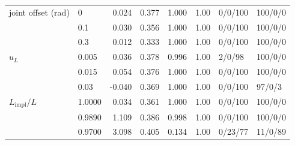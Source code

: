 \begin{tabular}{@{}llrrrrll@{}}
joint offset (rad) & 0 & 0.024 & 0.377 & 1.000 & 1.00 & 0/0/100 & 100/0/0 \\
 & 0.1 & 0.030 & 0.356 & 1.000 & 1.00 & 0/0/100 & 100/0/0 \\
 & 0.3 & 0.012 & 0.333 & 1.000 & 1.00 & 0/0/100 & 100/0/0 \\
\addlinespace
$u_L$ & 0.005 & 0.036 & 0.378 & 0.996 & 1.00 & 2/0/98 & 100/0/0 \\
 & 0.015 & 0.054 & 0.376 & 1.000 & 1.00 & 0/0/100 & 100/0/0 \\
 & 0.03 & -0.040 & 0.369 & 1.000 & 1.00 & 0/0/100 & 97/0/3 \\
\addlinespace
$L_{\mathrm{impl}}/L$ & 1.0000 & 0.034 & 0.361 & 1.000 & 1.00 & 0/0/100 & 100/0/0 \\
 & 0.9890 & 1.109 & 0.386 & 0.998 & 1.00 & 0/0/100 & 100/0/0 \\
 & 0.9700 & 3.098 & 0.405 & 0.134 & 1.00 & 0/23/77 & 11/0/89 \\
\bottomrule\end{tabular}
